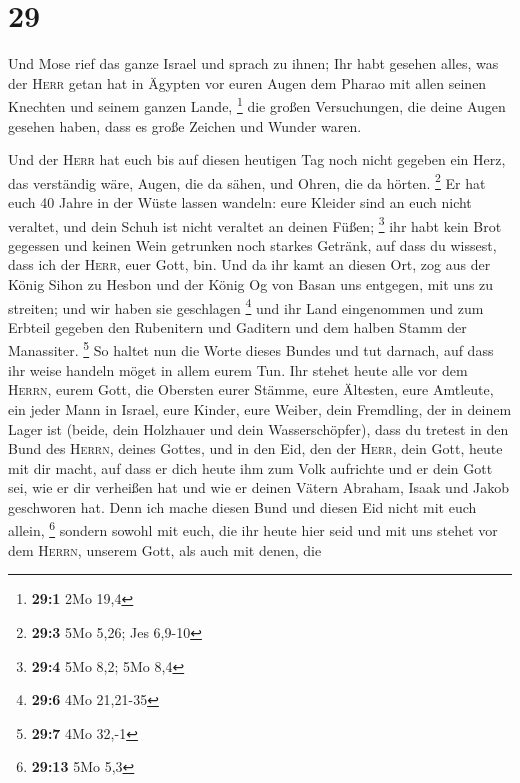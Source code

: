 \hypertarget{section-8}{%
\section{29}\label{section-8}}

 Und Mose rief das ganze Israel und sprach zu ihnen; Ihr
habt gesehen alles, was der \textsc{Herr} getan hat in Ägypten vor euren
Augen dem Pharao mit allen seinen Knechten und seinem ganzen Lande,
\footnote{\textbf{29:1} 2Mo 19,4}  die großen
Versuchungen, die deine Augen gesehen haben, dass es große Zeichen und
Wunder waren.

 Und der \textsc{Herr} hat euch bis auf diesen heutigen
Tag noch nicht gegeben ein Herz, das verständig wäre, Augen, die da
sähen, und Ohren, die da hörten. \footnote{\textbf{29:3} 5Mo 5,26; Jes
  6,9-10}  Er hat euch 40 Jahre in der Wüste lassen
wandeln: eure Kleider sind an euch nicht veraltet, und dein Schuh ist
nicht veraltet an deinen Füßen; \footnote{\textbf{29:4} 5Mo 8,2; 5Mo 8,4}
 ihr habt kein Brot gegessen und keinen Wein getrunken
noch starkes Getränk, auf dass du wissest, dass ich der \textsc{Herr},
euer Gott, bin.  Und da ihr kamt an diesen Ort, zog aus
der König Sihon zu Hesbon und der König Og von Basan uns entgegen, mit
uns zu streiten; und wir haben sie geschlagen \footnote{\textbf{29:6}
  4Mo 21,21-35}  und ihr Land eingenommen und zum Erbteil
gegeben den Rubenitern und Gaditern und dem halben Stamm der Manassiter.
\footnote{\textbf{29:7} 4Mo 32,-1}  So haltet nun die
Worte dieses Bundes und tut darnach, auf dass ihr weise handeln möget in
allem eurem Tun.  Ihr stehet heute alle vor dem
\textsc{Herrn}, eurem Gott, die Obersten eurer Stämme, eure Ältesten,
eure Amtleute, ein jeder Mann in Israel,  eure Kinder,
eure Weiber, dein Fremdling, der in deinem Lager ist (beide, dein
Holzhauer und dein Wasserschöpfer),  dass du tretest in
den Bund des \textsc{Herrn}, deines Gottes, und in den Eid, den der
\textsc{Herr}, dein Gott, heute mit dir macht,  auf dass
er dich heute ihm zum Volk aufrichte und er dein Gott sei, wie er dir
verheißen hat und wie er deinen Vätern Abraham, Isaak und Jakob
geschworen hat.  Denn ich mache diesen Bund und diesen
Eid nicht mit euch allein, \footnote{\textbf{29:13} 5Mo 5,3}
 sondern sowohl mit euch, die ihr heute hier seid und mit
uns stehet vor dem \textsc{Herrn}, unserem Gott, als auch mit denen, die
